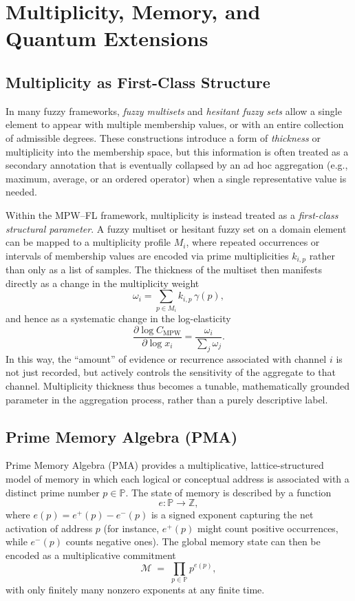 \documentclass[11pt]{article}
\begin{document}
\section{Multiplicity, Memory, and Quantum Extensions}
\label{sec:multiplicity-memory-quantum}

\subsection{Multiplicity as First-Class Structure}
\label{subsec:multiplicity-first-class}

In many fuzzy frameworks, \emph{fuzzy multisets} and \emph{hesitant fuzzy sets} allow a single element to appear with multiple membership values, or with an entire collection of admissible degrees. These constructions introduce a form of \emph{thickness} or multiplicity into the membership space, but this information is often treated as a secondary annotation that is eventually collapsed by an ad hoc aggregation (e.g., maximum, average, or an ordered operator) when a single representative value is needed.

Within the MPW--FL framework, multiplicity is instead treated as a \emph{first-class structural parameter}. A fuzzy multiset or hesitant fuzzy set on a domain element can be mapped to a multiplicity profile $M_i$, where repeated occurrences or intervals of membership values are encoded via prime multiplicities $k_{i,p}$ rather than only as a list of samples. The thickness of the multiset then manifests directly as a change in the multiplicity weight
\[
  \omega_i = \sum_{p \in M_i} k_{i,p}\,\gamma(p),
\]
and hence as a systematic change in the log-elasticity
\[
  \frac{\partial \log C_{\mathrm{MPW}}}{\partial \log x_i}
  = \frac{\omega_i}{\sum_j \omega_j}.
\]
In this way, the ``amount'' of evidence or recurrence associated with channel $i$ is not just recorded, but actively controls the sensitivity of the aggregate to that channel. Multiplicity thickness thus becomes a tunable, mathematically grounded parameter in the aggregation process, rather than a purely descriptive label.

\subsection{Prime Memory Algebra (PMA)}
\label{subsec:pma}

Prime Memory Algebra (PMA) provides a multiplicative, lattice-structured model of memory in which each logical or conceptual address is associated with a distinct prime number $p \in \mathbb{P}$. The state of memory is described by a function
\[
  e : \mathbb{P} \to \mathbb{Z},
\]
where $e(p) = e^+(p) - e^-(p)$ is a signed exponent capturing the net activation of address $p$ (for instance, $e^+(p)$ might count positive occurrences, while $e^-(p)$ counts negative ones). The global memory state can then be encoded as a multiplicative commitment
\[
  \mathcal{M} \;=\; \prod_{p \in \mathbb{P}} p^{e(p)},
\]
with only finitely many nonzero exponents at any finite time.
\end{document}
